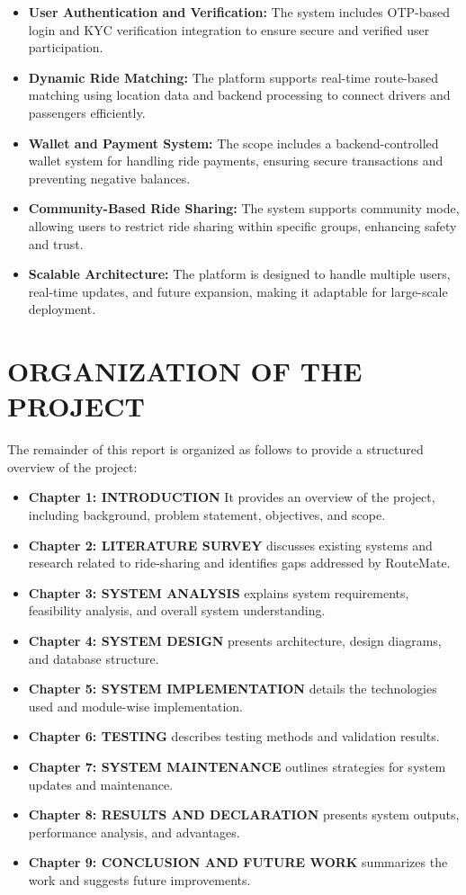 \documentclass[10pt,a4paper]{report}
\begin{document}
\begin{itemize}
    \item \textbf{User Authentication and Verification:} The system includes OTP-based login and KYC verification integration to ensure secure and verified user participation.

    \item \textbf{Dynamic Ride Matching:} The platform supports real-time route-based matching using location data and backend processing to connect drivers and passengers efficiently.

    \item \textbf{Wallet and Payment System:} The scope includes a backend-controlled wallet system for handling ride payments, ensuring secure transactions and preventing negative balances.

    \item \textbf{Community-Based Ride Sharing:} The system supports community mode, allowing users to restrict ride sharing within specific groups, enhancing safety and trust.

    \item \textbf{Scalable Architecture:} The platform is designed to handle multiple users, real-time updates, and future expansion, making it adaptable for large-scale deployment.
\end{itemize}

\section{\textbf{ORGANIZATION OF THE PROJECT}}
\large\justify
The remainder of this report is organized as follows to provide a structured overview of the project:

\begin{itemize}
    \item \textbf{Chapter 1: INTRODUCTION}
    It provides an overview of the project, including background, problem statement, objectives, and scope.
    \item \textbf{Chapter 2: LITERATURE SURVEY} discusses existing systems and research related to ride-sharing and identifies gaps addressed by RouteMate.
    \item \textbf{Chapter 3: SYSTEM ANALYSIS} explains system requirements, feasibility analysis, and overall system understanding.
    \item \textbf{Chapter 4: SYSTEM DESIGN} presents architecture, design diagrams, and database structure.
    \item \textbf{Chapter 5: SYSTEM IMPLEMENTATION} details the technologies used and module-wise implementation.
    \item \textbf{Chapter 6: TESTING} describes testing methods and validation results.
    \item \textbf{Chapter 7: SYSTEM MAINTENANCE} outlines strategies for system updates and maintenance.
    \item \textbf{Chapter 8: RESULTS AND DECLARATION} presents system outputs, performance analysis, and advantages.
    \item \textbf{Chapter 9: CONCLUSION AND FUTURE WORK} summarizes the work and suggests future improvements.
\end{itemize}
\end{document}

